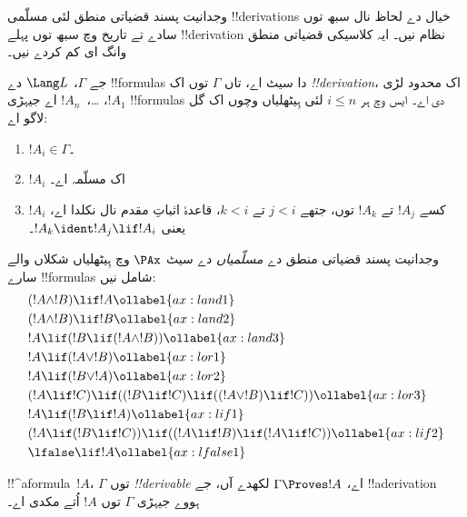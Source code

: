 \documentclass[../../../include/open-logic-section]{subfiles}
\begin{document}


وجدانیت پسند قضیاتی منطق لئی مسلّمی !!{derivation}s خیال دے لحاظ
نال سبھ توں سادے تے تاریخ وچ سبھ توں پہلے !!{derivation} نظام نیں۔
ایہ کلاسیکی قضیاتی منطق وانگ ای کم کردے نیں۔

\begin{defn}[!!^{derivability}]
جے $\Gamma$، $\Lang L$ دے !!{formula}s دا سیٹ اے، تاں $\Gamma$
توں اک \emph{!!{derivation}}، اک محدود لڑی $!A_1$،
\dots،~$!A_n$ اے جیہڑی !!{formula}s دی اے۔ ایس وچ ہر $i \le n$ لئی ہِیٹھلیاں وچوں اک
گل لاگو اے:
\begin{enumerate}
\item $!A_i \in \Gamma$۔
\item $!A_i$ اک مسلّمہ اے۔
\item $!A_i$ کسے $!A_j$ تے $!A_k$ توں، جتھے $j < i$ تے $k <
  i$، قاعدۂ اثباتِ مقدم نال نکلدا اے، یعنی $!A_k \ident !A_j \lif !A_i$۔
\end{enumerate}
\end{defn}

\begin{defn}[مسلّمے]
وجدانیت پسند قضیاتی منطق دے \emph{مسلّمیاں} دے سیٹ $\PAx$ وچ ہِیٹھلیاں
شکلاں والے سارے !!{formula}s شامل نیں:
\begin{align}
  & (!A \land !B) \lif !A \ollabel{ax:land1}\\
  & (!A \land !B) \lif !B \ollabel{ax:land2}\\
  & !A \lif (!B \lif (!A \land !B)) \ollabel{ax:land3}\\
  & !A \lif (!A \lor !B) \ollabel{ax:lor1}\\
  & !A \lif (!B \lor !A) \ollabel{ax:lor2}\\
  & (!A \lif !C) \lif ((!B \lif !C) \lif ((!A \lor !B) \lif !C)) \ollabel{ax:lor3}\\
  & !A \lif (!B \lif !A) \ollabel{ax:lif1}\\
  & (!A \lif (!B \lif !C)) \lif ((!A \lif !B) \lif (!A \lif !C)) \ollabel{ax:lif2}\\
  & \lfalse \lif !A \ollabel{ax:lfalse1}
\end{align}
\end{defn}

\begin{defn}[!!^{derivability}]
!!^a{formula}~$!A$، $\Gamma$ توں \emph{!!{derivable}} اے،
$\Gamma \Proves !A$ لکھدے آں، جے !!a{derivation} ہووے جیہڑی
$\Gamma$ توں $!A$ اُتے مکدی اے۔
\end{defn}
\end{document}
